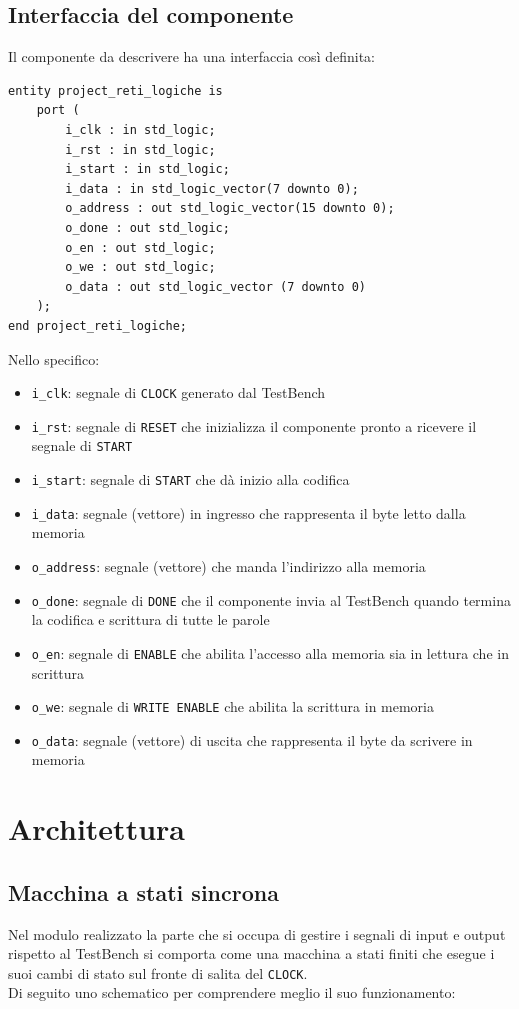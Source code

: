 \documentclass{article}
\begin{document}
\subsection{Interfaccia del componente}
Il componente da descrivere ha una interfaccia così definita:
\begin{verbatim}
entity project_reti_logiche is
    port (
        i_clk : in std_logic;
        i_rst : in std_logic;
        i_start : in std_logic;
        i_data : in std_logic_vector(7 downto 0);
        o_address : out std_logic_vector(15 downto 0);
        o_done : out std_logic;
        o_en : out std_logic;
        o_we : out std_logic;
        o_data : out std_logic_vector (7 downto 0)
    );
end project_reti_logiche;
\end{verbatim}
Nello specifico:
\begin{itemize}
    \item \verb|i_clk|: segnale di \verb|CLOCK| generato dal TestBench
    \item \verb|i_rst|: segnale di \verb|RESET| che inizializza il componente pronto a ricevere il segnale di \verb|START|
    \item \verb|i_start|: segnale di \verb|START| che dà inizio alla codifica 
    \item \verb|i_data|: segnale (vettore) in ingresso che rappresenta il byte letto dalla memoria
    \item \verb|o_address|: segnale (vettore) che manda l'indirizzo alla memoria
    \item \verb|o_done|: segnale di \verb|DONE| che il componente invia al TestBench quando termina la codifica e scrittura di tutte le parole
    \item \verb|o_en|: segnale di \verb|ENABLE| che abilita l'accesso alla memoria sia in lettura che in scrittura
    \item \verb|o_we|: segnale di \verb|WRITE ENABLE| che abilita la scrittura in memoria
    \item \verb|o_data|: segnale (vettore) di uscita che rappresenta il byte da scrivere in memoria
\end{itemize}


\section{Architettura}

\subsection{Macchina a stati sincrona}
Nel modulo realizzato la parte che si occupa di gestire i segnali di input e output rispetto al TestBench si comporta come una macchina a stati finiti che esegue i suoi cambi di stato sul fronte di salita del \verb|CLOCK|.\\Di seguito uno schematico per comprendere meglio il suo funzionamento:
\end{document}
